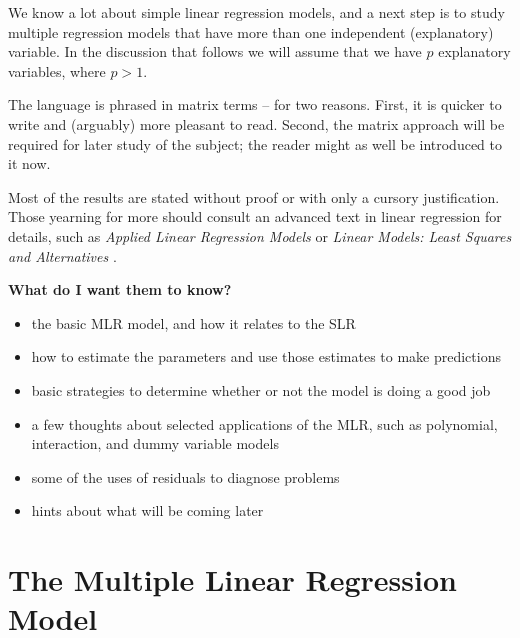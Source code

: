 \documentclass[captions=tableheading]{scrbook}
\begin{document}
\noindent 
We know a lot about simple linear regression models, and a next step is to study multiple regression models that have more than one independent (explanatory) variable. In the discussion that follows we will assume that we have \(p\) explanatory variables, where \(p>1\).

The language is phrased in matrix terms -- for two reasons. First, it is quicker to write and (arguably) more pleasant to read. Second, the matrix approach will be required for later study of the subject; the reader might as well be introduced to it now.

Most of the results are stated without proof or with only a cursory justification. Those yearning for more should consult an advanced text in linear regression for details, such as \emph{Applied Linear Regression Models} \cite{Neter1996} or \emph{Linear Models: Least Squares and Alternatives} \cite{Rao1999}.

\textbf{What do I want them to know?}
\begin{itemize}
\item the basic MLR model, and how it relates to the SLR
\item how to estimate the parameters and use those estimates to make predictions
\item basic strategies to determine whether or not the model is doing a good job
\item a few thoughts about selected applications of the MLR, such as polynomial, interaction, and dummy variable models
\item some of the uses of residuals to diagnose problems
\item hints about what will be coming later
\end{itemize}
\section{The Multiple Linear Regression Model}
\label{sec-12-1}
\label{sec-The-MLR-Model}
\end{document}

